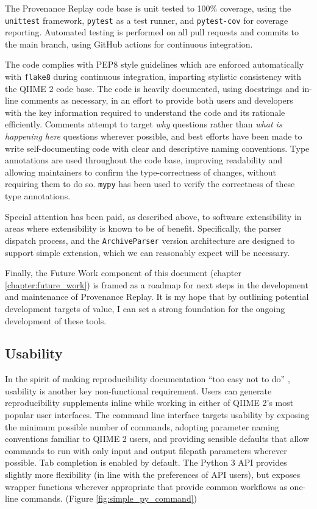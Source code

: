 The Provenance Replay code base is unit tested to 100\% coverage, using
the \texttt{unittest} \parencite{python_software_foundation_unittest_2001} framework,
\texttt{pytest} \parencite{krekel_pytest_2015} as a test runner, and \texttt{pytest-cov} \parencite{pytest-cov_contributors_welcome_2016}
for coverage reporting. Automated testing is performed on all pull requests and
commits to the main branch, using GitHub actions
\parencite{github_features_2022} for continuous integration.

The code complies with PEP8 style guidelines \parencite{van_rossum_pep_2001}
which are enforced automatically with \texttt{flake8} during continuous integration,
imparting stylistic consistency with the QIIME 2 code base. The code is heavily
documented, using docstrings and in-line comments as necessary, in an effort to
provide both users and developers with the key information required to
understand the code and its rationale efficiently. Comments attempt to target
\textit{why} questions rather than \textit{what is happening here} questions
wherever possible, and best efforts have been made to write self-documenting
code with clear and descriptive naming conventions. Type annotations
are used throughout the code base, improving readability and allowing
maintainers to confirm the type-correctness of changes, without requiring them
to do so. \texttt{mypy} \parencite{lehtosalo_mypy_2014} has been used to verify
the correctness of these type annotations.

Special attention has been paid, as described above, to software extensibility
in areas where extensibility is known to be of benefit. Specifically, the parser
dispatch process, and the \texttt{ArchiveParser} version architecture are designed to
support simple extension, which we can reasonably expect will be necessary. 

Finally, the Future Work component of this document (chapter \ref{chapter:future_work})
is framed as a roadmap for next steps in the development and maintenance of
Provenance Replay. It is my hope that by outlining potential development targets
of value, I can set a strong foundation for the ongoing development of these
tools.


\subsection{Usability}

In the spirit of making reproducibility documentation “too easy not to do” \parencite[19]{whitaker_turing_2019},
usability is another key non-functional requirement. Users can generate
reproducibility supplements inline while working in either of QIIME 2’s most
popular user interfaces. The command line interface targets usability by
exposing the minimum possible number of commands, adopting parameter naming
conventions familiar to QIIME 2 users, and providing sensible defaults that
allow commands to run with only input and output filepath parameters wherever
possible. Tab completion is enabled by default. The Python 3 API provides
slightly more flexibility (in line with the preferences of API users), but
exposes wrapper functions wherever appropriate that provide common workflows as
one-line commands. (Figure \ref{fig:simple_py_command})

